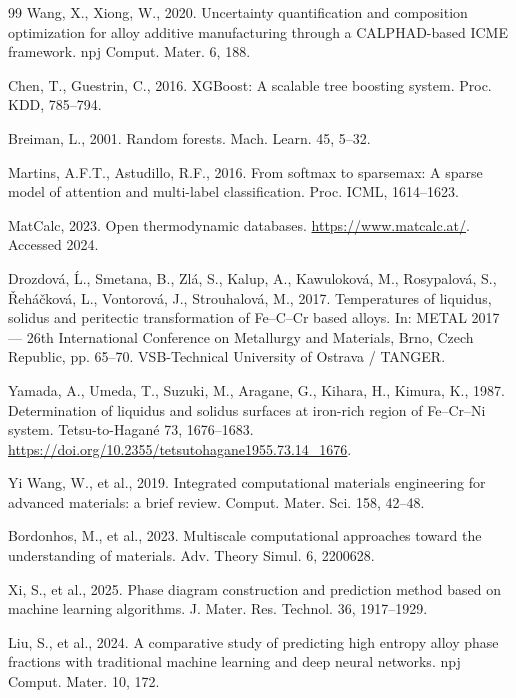 \documentclass[preprint,12pt,authoryear]{elsarticle}
\begin{document}
\begin{thebibliography}{99}
Wang, X., Xiong, W., 2020. Uncertainty quantification and composition
optimization for alloy additive manufacturing through a CALPHAD-based ICME
framework. npj Comput. Mater. 6, 188.

Chen, T., Guestrin, C., 2016. XGBoost: A scalable tree boosting system. Proc.
KDD, 785--794.

Breiman, L., 2001. Random forests. Mach. Learn. 45, 5--32.

Martins, A.F.T., Astudillo, R.F., 2016. From softmax to sparsemax: A sparse
model of attention and multi-label classification. Proc. ICML, 1614--1623.

MatCalc, 2023. Open thermodynamic databases.
\url{https://www.matcalc.at/}. Accessed 2024.

Drozdov\'a, \'L., Smetana, B., Zl\'a, S., Kalup, A., Kawulokov\'a, M.,
Rosypalov\'a, S., \v{R}eh\'a\v{c}kov\'a, L., Vontorov\'a, J., Strouhalov\'a,
M., 2017. Temperatures of liquidus, solidus and peritectic transformation
of Fe--C--Cr based alloys. In: METAL 2017 --- 26th International
Conference on Metallurgy and Materials, Brno, Czech Republic, pp. 65--70.
VSB-Technical University of Ostrava / TANGER.

Yamada, A., Umeda, T., Suzuki, M., Aragane, G., Kihara, H., Kimura, K.,
1987. Determination of liquidus and solidus surfaces at iron-rich region
of Fe--Cr--Ni system. Tetsu-to-Hagan\'e 73, 1676--1683.
\url{https://doi.org/10.2355/tetsutohagane1955.73.14_1676}.

Yi Wang, W., et al., 2019. Integrated computational materials engineering
for advanced materials: a brief review. Comput. Mater. Sci. 158, 42--48.

Bordonhos, M., et al., 2023. Multiscale computational approaches toward the
understanding of materials. Adv. Theory Simul. 6, 2200628.

Xi, S., et al., 2025. Phase diagram construction and prediction method
based on machine learning algorithms. J. Mater. Res. Technol. 36,
1917--1929.

Liu, S., et al., 2024. A comparative study of predicting high entropy alloy
phase fractions with traditional machine learning and deep neural networks.
npj Comput. Mater. 10, 172.


\end{thebibliography}
\end{document}
